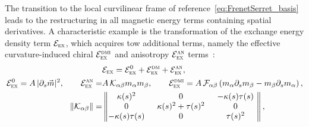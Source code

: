 \documentclass[showpacs,amsmath,amssymb,aps,pra,longbibliography,
10pt,preprint,superscriptaddress,showkeys]{revtex4-1}
\begin{document}
The transition to the local curvilinear frame of reference~\eqref{eq:FrenetSerret_basis} leads to the restructuring in all magnetic energy terms containing spatial derivatives. A characteristic example is the transformation of the exchange energy density term $\mathcal{E}_\textsc{ex}$, which acquires tow additional terms, namely the effective curvature-induced chiral $\mathcal{E}_\textsc{ex}^\textsc{dmi}$ and anisotropy $\mathcal{E}_\textsc{ex}^\textsc{an}$ terms~\cite{Sheka15,Gaididei17a}:
\begin{equation}\label{eq:exhange_FrenetSerret}
\begin{split}
&\mathcal{E}_\textsc{ex}=\mathcal{E}_\textsc{ex}^0+\mathcal{E}_\textsc{ex}^\textsc{dm}+\mathcal{E}_\textsc{ex}^\textsc{an}, \\
\mathcal{E}_\textsc{ex}^0=A\,|\partial_s\vec{m}|^2, \quad \quad \mathcal{E}_\textsc{ex}^\textsc{an}=&A\,\mathcal{K}_{\alpha\beta}m_\alpha m_\beta, \quad \quad \mathcal{E}_\textsc{ex}^\textsc{dmi}=A\,\mathcal{F}_{\alpha\beta}\left(m_\alpha \partial_s m_\beta-m_\beta\partial_s m_\alpha\right), \\
 \|\mathcal{K}_{\alpha\beta}\| =& \begin{Vmatrix*}  \kappa(s)^2 \, \, \,	& 0 & \, \, \, - \kappa(s) \tau(s) \, \,  \\ 0 \, \, \, & \kappa(s)^2+\tau(s)^2  & \, \, \, 0 \, \, \\  - \kappa(s) \tau(s) \, \, \, & 0 & \, \, \, \tau(s)^2 \, \, 
 \end{Vmatrix*},
\end{split}
\end{equation}
\end{document}
